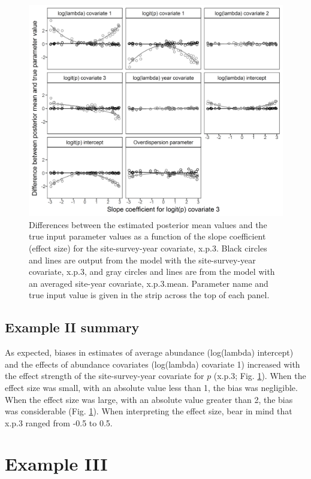 \documentclass[article]{jss}
\begin{document}
\begin{figure}
  \includegraphics[width=\linewidth]{fig2.png}
  \caption{Differences between the estimated posterior mean values and the true input parameter values as a function of the slope coefficient (effect size) for the site-survey-year covariate, x.p.3.  Black circles and lines are output from the model with the site-survey-year covariate, x.p.3, and gray circles and lines are from the model with an averaged site-year covariate, x.p.3.mean.  Parameter name and true input value is given in the strip across the top of each panel.}
  \label{fig:fig2}
\end{figure}

\subsection[Example II summary]{Example II summary}
As expected, biases in estimates of average abundance (log(lambda) intercept) and the effects of abundance covariates (log(lambda) covariate 1) increased with the effect strength of the site-survey-year covariate for $p$ (x.p.3;  Fig. \ref{fig:fig2}). When the effect size was small, with an absolute value less than 1, the bias was negligible. When the effect size was large, with an absolute value greater than 2, the bias was considerable (Fig. \ref{fig:fig2}). When interpreting the effect size, bear in mind that x.p.3 ranged from -0.5 to 0.5.

\section[Example III]{Example III}
\end{document}
